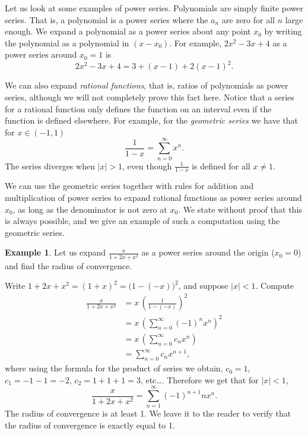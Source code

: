 \documentclass[12pt]{book}
\newcommand{\abs}[1]{\left\lvert {#1} \right\rvert}
\newcommand{\myindex}[1]{#1\index{#1}}
\theoremstyle{plain}
\theoremstyle{remark}
\theoremstyle{definition}
\theoremstyle{exercise}
\theoremstyle{example}
\newtheorem{example}[thm]{Example}
\begin{document}
Let us look at some examples of power series.
Polynomials are simply finite power series.  That is, a polynomial
is a power series where
the $a_n$ are zero for all $n$ large enough.  We expand
a polynomial as a power series about any point $x_0$ by writing
the polynomial as a polynomial in $(x-x_0)$.  For example,
$2x^2-3x+4$ as a power series around $x_0 = 1$ is
\begin{equation*}
2x^2-3x+4 = 3 + (x-1) + 2{(x-1)}^2 .
\end{equation*}

We can also expand
\emph{\myindex{rational functions}}, that is, ratios of polynomials
as power series, although we will not completely prove this fact here.
Notice that a series for a rational function only defines the function
on an interval even if the function is defined elsewhere.  For example, for
the \emph{\myindex{geometric series}} we have that for
$x \in (-1,1)$
\begin{equation*}
\frac{1}{1-x} =
\sum_{n=0}^\infty x^n .
\end{equation*}
The series diverges when $\abs{x} > 1$, even though $\frac{1}{1-x}$ is
defined for all $x \not= 1$.

We can use the geometric series together with rules for addition and
multiplication of power series to expand rational functions as power
series around $x_0$,
as long as the denominator is not zero at $x_0$.  We state without
proof that this is always possible, and we give an example of such
a computation using the geometric series.

\begin{example}
Let us expand $\frac{x}{1+2x+x^2}$ as a power series around the origin ($x_0 = 0$) and
find the radius of convergence.

Write $1+2x+x^2 = {(1+x)}^2 = {\bigl(1-(-x)\bigr)}^2$, and suppose
$\abs{x} < 1$.  Compute
\begin{equation*}
\begin{split}
\frac{x}{1+2x+x^2}
&=
x \,
{\left(
\frac{1}{1-(-x)}
\right)}^2
\\
&=
x \,
{\left( 
\sum_{n=0}^\infty {(-1)}^n x^n 
\right)}^2
\\
&=
x \,
\left(
\sum_{n=0}^\infty c_n x^n 
\right)
\\
&=
\sum_{n=0}^\infty c_n x^{n+1} ,
\end{split}
\end{equation*}
where using the formula for the product of series
we obtain, $c_0 = 1$, $c_1 = -1 -1 = -2$, $c_2 = 1+1+1 = 3$, etc\ldots.
Therefore we get that for $\abs{x} < 1$, 
\begin{equation*}
\frac{x}{1+2x+x^2}
=
\sum_{n=1}^\infty {(-1)}^{n+1} n x^n .
\end{equation*}
The radius of convergence is at least 1.  We leave it to the reader to
verify that the radius of convergence is exactly equal to 1.
\end{example}
\end{document}
